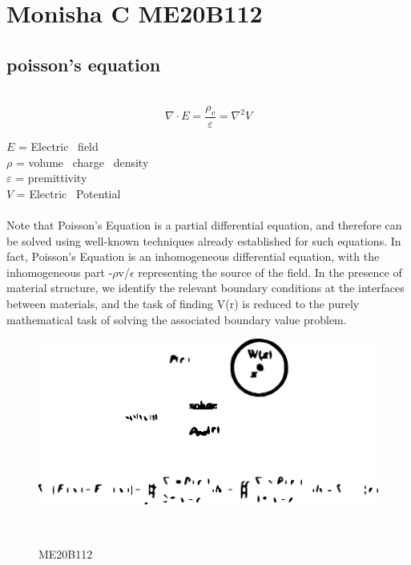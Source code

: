 \section{Monisha C ME20B112}
\subsection{poisson's equation}~\cite{poisson's}
\begin{equation}
\nabla \cdot E = \frac{\rho_v}{\varepsilon} = \nabla^2 V
\end {equation}
\begin{flushleft}
$E$ = Electric \ field \\
$\rho$ = volume \ charge \ density \\
$\varepsilon$ = premittivity\\
$V$ = Electric \ Potential
\end{flushleft}

\paragraph{}
Note that Poisson’s Equation is a partial differential equation, and therefore can be solved using well-known techniques already established for such equations. In fact, Poisson’s Equation is an inhomogeneous differential equation, with the inhomogeneous part  -{$\rho$}v/{$\epsilon$} representing the source of the field. In the presence of material structure, we identify the relevant boundary conditions at the interfaces between materials, and the task of finding  V(r)  is reduced to the purely mathematical task of solving the associated boundary value problem.


\begin{figure}[h]
\begin{center}
\includegraphics[scale=0.5]{ME20B112.eps}
\caption{ME20B112}~\cite{me20b112}
\label{fig:poisson}
\end{center}
\end{figure}




